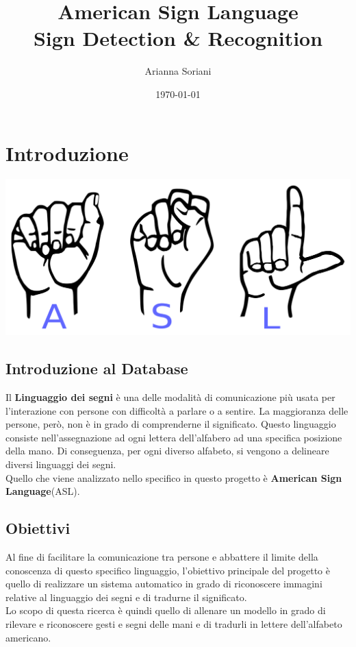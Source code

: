 \documentclass{report}
\begin{document}
\title{
    American Sign Language \\
    \large Sign Detection \& Recognition
}

\author{Arianna Soriani}

\date{\today}

\maketitle

\tableofcontents
\newpage

\section{Introduzione}
\includegraphics[height=%
0.29\textheight]{asl}\\
\subsection{Introduzione al Database}
Il \textbf{Linguaggio dei segni} è una delle modalità di comunicazione più usata per l'interazione con persone con difficoltà a parlare o a sentire. La maggioranza delle persone, però, non è in grado di comprenderne il significato. Questo linguaggio consiste nell'assegnazione ad ogni lettera dell'alfabero ad una specifica posizione della mano. Di conseguenza, per ogni diverso alfabeto, si vengono a delineare diversi linguaggi dei segni.\\
Quello che viene analizzato nello specifico in questo progetto è \textbf{American Sign Language}(ASL).

\subsection{Obiettivi}
Al fine di facilitare la comunicazione tra persone e abbattere il limite della conoscenza di questo specifico linguaggio, l'obiettivo principale del progetto è quello di realizzare un sistema automatico in grado di riconoscere  immagini relative al linguaggio dei segni e di tradurne il significato. \\
Lo scopo di questa ricerca è quindi quello di allenare un modello in grado di rilevare e riconoscere gesti e segni delle mani e di tradurli in lettere dell'alfabeto americano.
\newpage
\end{document}
